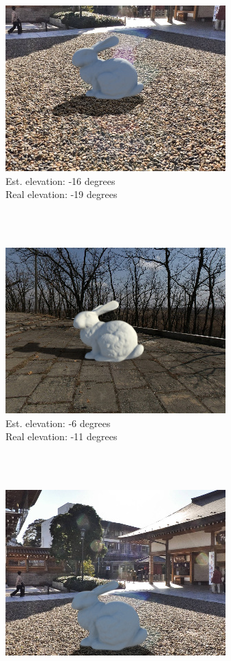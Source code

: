 \begin{multicols}{2}

\begin{minipage}{\linewidth}
\includegraphics[width=\mywidth]{pano_aaqpmaoqocdqfu_005.jpg}\\
Est. elevation: -16 degrees\\
Real elevation: -19 degrees\\
\end{minipage} \\
~\\
\begin{minipage}{\linewidth}
\includegraphics[width=\mywidth]{pano_aczfirgbavyyri_002.jpg}\\
Est. elevation: -6 degrees\\
Real elevation: -11 degrees\\
\end{minipage} \\
~\\
\begin{minipage}{\linewidth}
\includegraphics[width=\mywidth]{pano_aaqpmaoqocdqfu_002.jpg}\\

\end{minipage}
\end{multicols}
